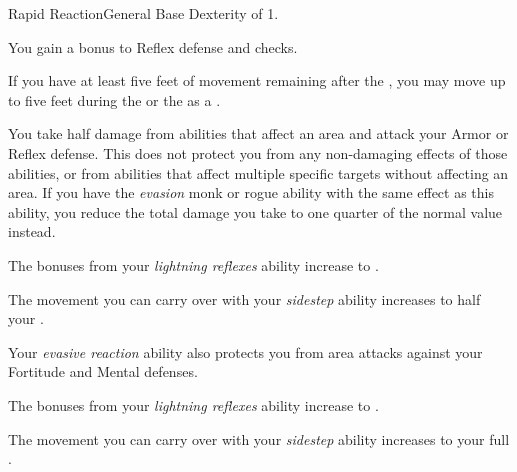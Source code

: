     \begin{feat}{Rapid Reaction}{General}
        \featpre Base Dexterity of 1.

         You gain a  bonus to Reflex defense and  checks.

         If you have at least five feet of movement remaining after the , you may move up to five feet during the  or the  as a .

         You take half damage from abilities that affect an area and attack your Armor or Reflex defense.
        This does not protect you from any non-damaging effects of those abilities, or from abilities that affect multiple specific targets without affecting an area.
        If you have the \textit{evasion} monk or rogue ability with the same effect as this ability, you reduce the total damage you take to one quarter of the normal value instead.

         The bonuses from your \textit{lightning reflexes} ability increase to .

         The movement you can carry over with your \textit{sidestep} ability increases to half your .

         Your \textit{evasive reaction} ability also protects you from area attacks against your Fortitude and Mental defenses.

         The bonuses from your \textit{lightning reflexes} ability increase to .

         The movement you can carry over with your \textit{sidestep} ability increases to your full .
    \end{feat}

